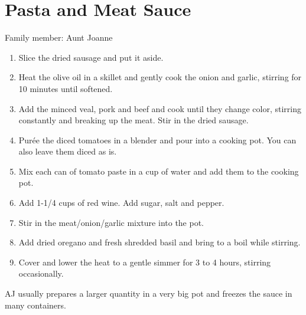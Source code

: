 \chapter{Pasta and Meat Sauce}
\label{ch:pastameatsauce}


Family member: Aunt Joanne

\begin{enumerate}
    \item Slice the dried sausage and put it aside.
    \item Heat the olive oil in a skillet and gently cook the onion and garlic, stirring for 10 minutes until softened.
    \item Add the minced veal, pork and beef and cook until they change color, stirring constantly and breaking up the meat. Stir in the dried sausage.
    \item Purée the diced tomatoes in a blender and pour into a cooking pot. You can also leave them diced as is.
    \item Mix each can of tomato paste in a cup of water and add them to the cooking pot.
    \item Add 1-1/4 cups of red wine. Add sugar, salt and pepper.
    \item Stir in the meat/onion/garlic mixture into the pot.
    \item Add dried oregano and fresh shredded basil and bring to a boil while stirring.
    \item Cover and lower the heat to a gentle simmer for 3 to 4 hours, stirring occasionally.
\end{enumerate}

AJ usually prepares a larger quantity in a very big pot and freezes the sauce in many containers.
